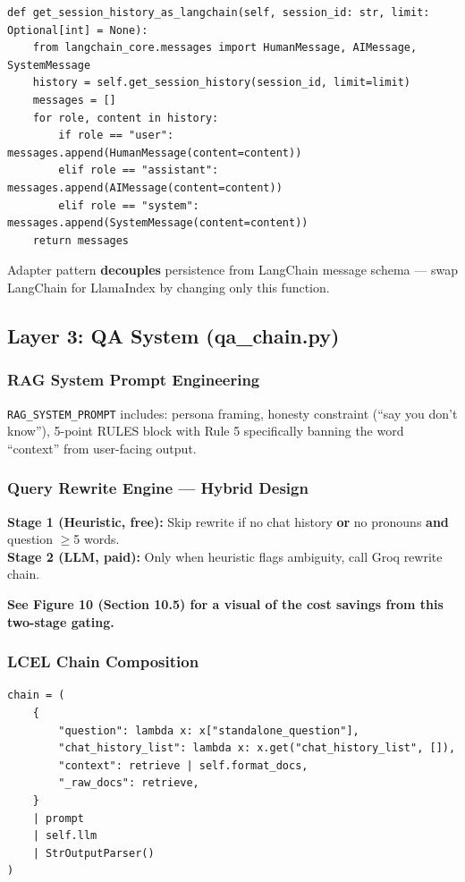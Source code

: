 \documentclass[12pt,a4paper]{article}
\begin{document}
\begin{lstlisting}
def get_session_history_as_langchain(self, session_id: str, limit: Optional[int] = None):
    from langchain_core.messages import HumanMessage, AIMessage, SystemMessage
    history = self.get_session_history(session_id, limit=limit)
    messages = []
    for role, content in history:
        if role == "user":    messages.append(HumanMessage(content=content))
        elif role == "assistant": messages.append(AIMessage(content=content))
        elif role == "system": messages.append(SystemMessage(content=content))
    return messages
\end{lstlisting}

Adapter pattern \textbf{decouples} persistence from LangChain message schema — swap LangChain for LlamaIndex by changing only this function.

\subsection{Layer 3: QA System (qa\_chain.py)}

\subsubsection{RAG System Prompt Engineering}
\texttt{RAG\_SYSTEM\_PROMPT} includes: persona framing, honesty constraint (``say you don't know''), 5-point RULES block with Rule 5 specifically banning the word ``context'' from user-facing output.

\subsubsection{Query Rewrite Engine — Hybrid Design}
\textbf{Stage 1 (Heuristic, free):} Skip rewrite if no chat history \textbf{or} no pronouns \textbf{and} question $\ge$5 words. \\
\textbf{Stage 2 (LLM, paid):} Only when heuristic flags ambiguity, call Groq rewrite chain.

\textbf{See Figure 10 (Section 10.5) for a visual of the cost savings from this two-stage gating.}

\subsubsection{LCEL Chain Composition}

\begin{lstlisting}
chain = (
    {
        "question": lambda x: x["standalone_question"],
        "chat_history_list": lambda x: x.get("chat_history_list", []),
        "context": retrieve | self.format_docs,
        "_raw_docs": retrieve,
    }
    | prompt
    | self.llm
    | StrOutputParser()
)
\end{lstlisting}
\end{document}
